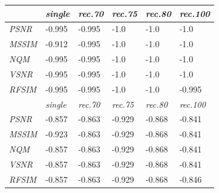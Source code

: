 \documentclass[10pt,twocolumn,letterpaper]{article}
\begin{document}
\begin{table}\footnotesize\centering
\begin{tabular}{ | l || l | l | l | l | l | }
    \hline
    & \emph{single} & \emph{rec.70} & \emph{rec.75} & \emph{rec.80} & \emph{rec.100} \\ \hline
    \emph{PSNR} & -0.995 \cellcolor[rgb]{0,0.5,0} & -0.995 \cellcolor[rgb]{0,0.5,0} & -1.0 \cellcolor[rgb]{0,0.5,0} & -1.0 \cellcolor[rgb]{0,0.5,0} & -1.0 \cellcolor[rgb]{0,0.5,0} \\ \hline
    \emph{MSSIM} & -0.912 \cellcolor[rgb]{0,0.5,0} & -0.995 \cellcolor[rgb]{0,0.5,0} & -1.0 \cellcolor[rgb]{0,0.5,0} & -1.0 \cellcolor[rgb]{0,0.5,0} & -1.0 \cellcolor[rgb]{0,0.5,0} \\ \hline
    \emph{NQM} & -0.995 \cellcolor[rgb]{0,0.5,0} & -0.995 \cellcolor[rgb]{0,0.5,0} & -1.0 \cellcolor[rgb]{0,0.5,0} & -1.0 \cellcolor[rgb]{0,0.5,0} & -1.0 \cellcolor[rgb]{0,0.5,0} \\ \hline
    \emph{VSNR} & -0.995 \cellcolor[rgb]{0,0.5,0} & -0.995 \cellcolor[rgb]{0,0.5,0} & -1.0 \cellcolor[rgb]{0,0.5,0} & -1.0 \cellcolor[rgb]{0,0.5,0} & -1.0 \cellcolor[rgb]{0,0.5,0} \\ \hline
    \emph{RFSIM} & -0.995 \cellcolor[rgb]{0,0.5,0} & -0.995 \cellcolor[rgb]{0,0.5,0} & -1.0 \cellcolor[rgb]{0,0.5,0} & -1.0 \cellcolor[rgb]{0,0.5,0} & -0.995 \cellcolor[rgb]{0,0.5,0} \\ \hline
    \hline
    
    \hline
    & \emph{single} & \emph{rec.70} & \emph{rec.75} & \emph{rec.80} & \emph{rec.100} \\ \hline
    \emph{PSNR} & -0.857 \cellcolor[rgb]{0,0.5,0} & -0.863 \cellcolor[rgb]{0,0.5,0} & -0.929 \cellcolor[rgb]{0,0.5,0} & -0.868 \cellcolor[rgb]{0,0.5,0} & -0.841 \cellcolor[rgb]{0,0.5,0} \\ \hline
    \emph{MSSIM} & -0.923 \cellcolor[rgb]{0,0.5,0} & -0.863 \cellcolor[rgb]{0,0.5,0} & -0.929 \cellcolor[rgb]{0,0.5,0} & -0.868 \cellcolor[rgb]{0,0.5,0} & -0.841 \cellcolor[rgb]{0,0.5,0} \\ \hline
    \emph{NQM} & -0.857 \cellcolor[rgb]{0,0.5,0} & -0.863 \cellcolor[rgb]{0,0.5,0} & -0.929 \cellcolor[rgb]{0,0.5,0} & -0.868 \cellcolor[rgb]{0,0.5,0} & -0.841 \cellcolor[rgb]{0,0.5,0} \\ \hline
    \emph{VSNR} & -0.857 \cellcolor[rgb]{0,0.5,0} & -0.863 \cellcolor[rgb]{0,0.5,0} & -0.929 \cellcolor[rgb]{0,0.5,0} & -0.868 \cellcolor[rgb]{0,0.5,0} & -0.841 \cellcolor[rgb]{0,0.5,0} \\ \hline
    \emph{RFSIM} & -0.857 \cellcolor[rgb]{0,0.5,0} & -0.863 \cellcolor[rgb]{0,0.5,0} & -0.929 \cellcolor[rgb]{0,0.5,0} & -0.868 \cellcolor[rgb]{0,0.5,0} & -0.846 \cellcolor[rgb]{0,0.5,0} \\ \hline


\end{tabular}
\end{table}
\end{document}
